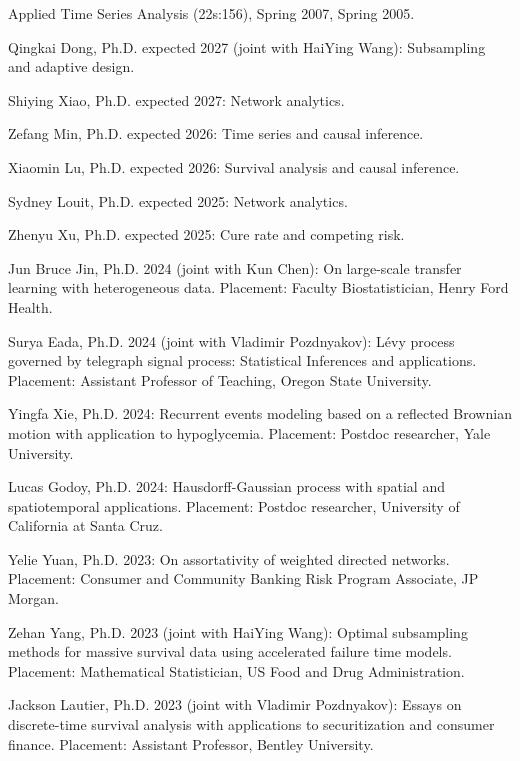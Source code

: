 \documentclass[Statistics]{vita}
\begin{document}
\begin{vita}
\begin{TeachingExperience}
\begin{UIowa}
    \item Applied Time Series Analysis (22s:156), Spring 2007, Spring 2005.
    \end{UIowa}
  \end{TeachingExperience}
  \begin{Students}
    \begin{Ph.D.}
    \item Qingkai Dong, Ph.D. expected 2027 (joint with HaiYing Wang): Subsampling and adaptive design.
    \item Shiying Xiao, Ph.D. expected 2027: Network analytics.
    \item Zefang Min, Ph.D. expected 2026: Time series and causal inference.
    \item Xiaomin Lu, Ph.D. expected 2026: Survival analysis and causal inference.
    \item Sydney Louit, Ph.D. expected 2025: Network analytics.
    \item Zhenyu Xu, Ph.D. expected 2025: Cure rate and competing risk.
    \item Jun Bruce Jin, Ph.D. 2024 (joint with Kun Chen): On large-scale transfer learning with heterogeneous data. Placement: Faculty Biostatistician, Henry Ford Health.
    \item Surya Eada, Ph.D. 2024 (joint with Vladimir Pozdnyakov): L\'evy process governed by telegraph signal process: Statistical Inferences and applications. Placement: Assistant Professor of Teaching, Oregon State University.
    \item Yingfa Xie, Ph.D. 2024: Recurrent events modeling based on a reflected Brownian motion with application to hypoglycemia. Placement: Postdoc researcher, Yale University.
    \item Lucas Godoy, Ph.D. 2024: Hausdorff-Gaussian process with spatial and spatiotemporal applications. Placement: Postdoc researcher, University of California at Santa Cruz.
    \item Yelie Yuan, Ph.D. 2023: On assortativity of weighted directed networks. Placement: Consumer and Community Banking Risk Program Associate,  JP Morgan.
    \item Zehan Yang, Ph.D. 2023 (joint with HaiYing Wang): Optimal subsampling methods for massive survival data using accelerated failure time models. Placement: Mathematical Statistician, US Food and Drug Administration.
    \item Jackson Lautier, Ph.D. 2023 (joint with Vladimir Pozdnyakov): Essays on discrete-time survival analysis with applications to securitization and consumer finance. Placement: Assistant Professor, Bentley University. 

\end{Ph.D.}
\end{Students}
\end{vita}
\end{document}
